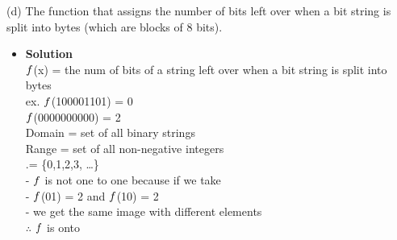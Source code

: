 \documentclass[11pt]{article}
\begin{document}
\begin{enumerate}

\begin{flushleft}
\end{flushleft}


\large (d) The function that assigns the number of bits left over when a bit string is split into bytes (which
are blocks of 8 bits).\\

\begin{itemize}
\item \textbf{Solution}\\
\large $\mathnormal{f}$(x) = the num of bits of a string
left over when a bit string is split into bytes\\
\large ex. $\mathnormal{f}$(100001101) = 0\\
\large $\mathnormal{f}$(0000000000) = 2\\
\large Domain = set of all binary strings\\
\large Range = set of all non-negative integers\\
\large .\hspace{1.1cm}= \{0,1,2,3, \dots \}\\
\large - $\mathnormal{f}$ is not one to one because
if we take \\
\large - $\mathnormal{f}$(01) = 2 and 
$\mathnormal{f}$(10) = 2\\
\large - we get the same image with different elements\\
\large $\therefore$ $\mathnormal{f}$ is onto\\

\end {itemize}
\end {enumerate}
\end{document}
